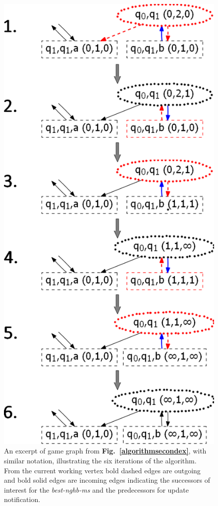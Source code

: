 \documentclass[12pt,oneside,bibliography=totoc,abstracton]{scrartcl}
\newcommand{\figref}[1]{\textbf{Fig.~\ref{#1}}}
\begin{document}
\begin{figure}
	 \begin{center}
		\includegraphics[scale=0.55]{res/algorithm_secondex_sequence}
	\end{center}
	\caption{An excerpt of game graph from \figref{algorithmsecondex}, with similar notation, illustrating
		the six iterations of the algorithm. From the current working vertex bold dashed edges are outgoing and
		bold solid edges are incoming edges indicating the successors of interest for the \textit{best-nghb-ms} and
		the predecessors for update notification.}
	\label{algorithmsecondexsequence}
\end{figure}\quad\\
\end{document}
